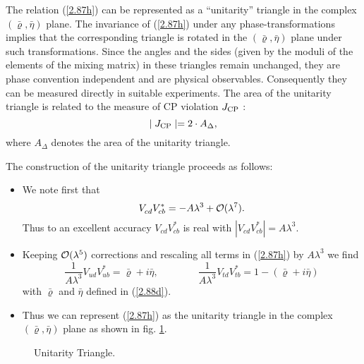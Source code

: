 \documentclass[12pt,rotate]{article}
\newcommand{\bi}{\begin{itemize}}
\newcommand{\ei}{\end{itemize}}
\newcommand{\ord}{{\cal O}}
\begin{document}
\begin{itemize}
The relation (\ref{2.87h})  can be
represented as a ``unitarity'' triangle in the complex 
$(\bar\varrho,\bar\eta)$ plane. 
The invariance of (\ref{2.87h})  under any phase-transformations
implies that the  corresponding triangle
is rotated in the $(\bar\varrho,\bar\eta)$  plane under such transformations. 
Since the angles and the sides
(given by the moduli of the elements of the
mixing matrix)  in these triangles remain unchanged, they
 are phase convention independent and are  physical observables.
Consequently they can be measured directly in suitable experiments.  
The area of the unitarity triangle  is related to the measure of CP violation 
$J_{\rm CP}$ \cite{js}:
\begin{equation}
\mid J_{\rm CP} \mid = 2\cdot A_{\Delta},
\end{equation}
where $A_{\Delta}$ denotes the area of the unitarity triangle.

The construction of the unitarity triangle proceeds as follows:

\bi
\item
We note first that
\begin{equation}\label{2.88a}
V_{cd}^{}V_{cb}^*=-A\lambda^3+\ord(\lambda^7).
\end{equation}
%
Thus to an excellent accuracy $V_{cd}^{}V_{cb}^*$ is real with
$| V_{cd}^{}V_{cb}^*|=A\lambda^3$.
\item
Keeping $\ord(\lambda^5)$ corrections and rescaling all terms in
(\ref{2.87h})
by $A \lambda^3$ 
we find
\begin{equation}\label{2.88b}
 \frac{1}{A\lambda^3}V_{ud}^{}V_{ub}^*
=\bar\varrho+i\bar\eta,
\qquad
\qquad
 \frac{1}{A\lambda^3}V_{td}^{}V_{tb}^*
=1-(\bar\varrho+i\bar\eta)
\end{equation}
with $\bar\varrho$ and $\bar\eta$ defined in (\ref{2.88d}). 
\item
Thus we can represent (\ref{2.87h}) as the unitarity triangle 
in the complex $(\bar\varrho,\bar\eta)$ plane 
as shown in fig. \ref{fig:utriangle}.
\ei

\begin{figure}[hbt]
\vspace{0.10in}
\centerline{
\epsfysize=2.1in
}
\vspace{0.08in}
\caption{Unitarity Triangle.}\label{fig:utriangle}
\end{figure}


\end{itemize}
\end{document}
